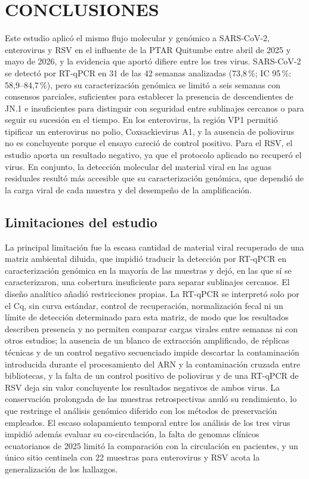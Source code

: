 \section{CONCLUSIONES}

Este estudio aplicó el mismo flujo molecular y genómico a SARS-CoV-2, enterovirus y RSV en el influente de la PTAR Quitumbe entre abril de 2025 y mayo de 2026, y la evidencia que aportó difiere entre los tres virus. SARS-CoV-2 se detectó por RT-qPCR en 31 de las 42 semanas analizadas (73,8\,\%; IC 95\,\%: 58,9--84,7\,\%), pero su caracterización genómica se limitó a seis semanas con consensos parciales, suficientes para establecer la presencia de descendientes de JN.1 e insuficientes para distinguir con seguridad entre sublinajes cercanos o para seguir su sucesión en el tiempo. En los enterovirus, la región VP1 permitió tipificar un enterovirus no polio, Coxsackievirus A1, y la ausencia de poliovirus no es concluyente porque el ensayo careció de control positivo. Para el RSV, el estudio aporta un resultado negativo, ya que el protocolo aplicado no recuperó el virus. En conjunto, la detección molecular del material viral en las aguas residuales resultó más accesible que su caracterización genómica, que dependió de la carga viral de cada muestra y del desempeño de la amplificación.

\subsection{Limitaciones del estudio}

La principal limitación fue la escasa cantidad de material viral recuperado de una matriz ambiental diluida, que impidió traducir la detección por RT-qPCR en caracterización genómica en la mayoría de las muestras y dejó, en las que sí se caracterizaron, una cobertura insuficiente para separar sublinajes cercanos. El diseño analítico añadió restricciones propias. La RT-qPCR se interpretó solo por el Cq, sin curva estándar, control de recuperación, normalización fecal ni un límite de detección determinado para esta matriz, de modo que los resultados describen presencia y no permiten comparar cargas virales entre semanas ni con otros estudios; la ausencia de un blanco de extracción amplificado, de réplicas técnicas y de un control negativo secuenciado impide descartar la contaminación introducida durante el procesamiento del ARN y la contaminación cruzada entre bibliotecas, y la falta de un control positivo de poliovirus y de una RT-qPCR de RSV deja sin valor concluyente los resultados negativos de ambos virus. La conservación prolongada de las muestras retrospectivas anuló su rendimiento, lo que restringe el análisis genómico diferido con los métodos de preservación empleados. El escaso solapamiento temporal entre los análisis de los tres virus impidió además evaluar su co-circulación, la falta de genomas clínicos ecuatorianos de 2025 limitó la comparación con la circulación en pacientes, y un único sitio centinela con 22 muestras para enterovirus y RSV acota la generalización de los hallazgos.

